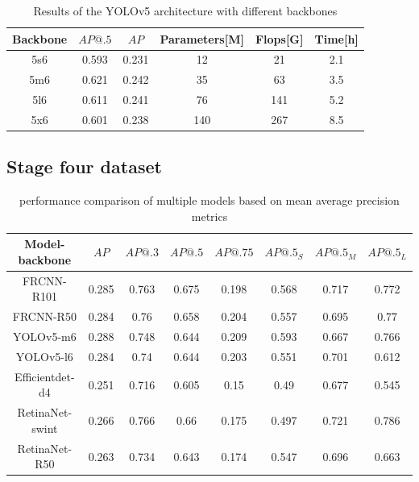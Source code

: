 \begin{table}[H]
    \begin{tabular}{|c|c|c|c|c|c|}
        \hline
        Backbone & $AP@.5$ & $AP$  & Parameters[M] & Flops[G] & Time[h] \\ \hline
        5s6      & 0.593   & 0.231 & 12            & 21       & 2.1     \\ \hline
        5m6      & 0.621   & 0.242 & 35            & 63       & 3.5     \\ \hline
        5l6      & 0.611   & 0.241 & 76            & 141      & 5.2     \\ \hline
        5x6      & 0.601   & 0.238 & 140           & 267      & 8.5     \\ \hline
    \end{tabular}
    \caption{Results of the YOLOv5 architecture with different backbones}
    \label{tab:yolov5_backbones}
\end{table}

\subsection{Stage four dataset}

\begin{table}[H]
    \begin{tabular}{|c|c|c|c|c|c|c|c|}
        \hline
        Model-backbone  & $AP$  & $AP@.3$ & $AP@.5$ & $AP@.75$ & $AP@.5_S$ & $AP@.5_M$ & $AP@.5_L$ \\ \hline
        FRCNN-R101      & 0.285 & 0.763   & 0.675   & 0.198    & 0.568     & 0.717     & 0.772     \\ \hline
        FRCNN-R50       & 0.284 & 0.76    & 0.658   & 0.204    & 0.557     & 0.695     & 0.77      \\ \hline
        YOLOv5-m6       & 0.288 & 0.748   & 0.644   & 0.209    & 0.593     & 0.667     & 0.766     \\ \hline
        YOLOv5-l6       & 0.284 & 0.74    & 0.644   & 0.203    & 0.551     & 0.701     & 0.612     \\ \hline
        Efficientdet-d4 & 0.251 & 0.716   & 0.605   & 0.15     & 0.49      & 0.677     & 0.545     \\ \hline
        RetinaNet-swint & 0.266 & 0.766   & 0.66    & 0.175    & 0.497     & 0.721     & 0.786     \\ \hline
        RetinaNet-R50   & 0.263 & 0.734   & 0.643   & 0.174    & 0.547     & 0.696     & 0.663     \\ \hline
    \end{tabular}
    \caption{performance comparison of multiple models based on mean average precision metrics}
    \label{tab:model_results:stage_four}
\end{table}

